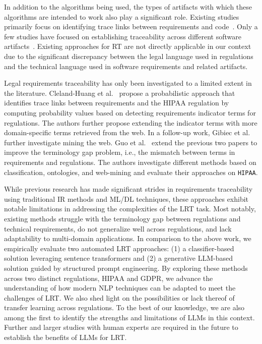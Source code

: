 In addition to the algorithms being used, the types of artifacts with which these algorithms are intended to work also play a significant role. Existing studies primarily focus on identifying trace links between requirements and code~\cite{north2024code,peng2023enhancing,cleland:2010,panichella2013and,kuang2017analyzing,gao2022using,vogelsang2025impact}. Only a few studies have focused on establishing traceability across different software artifacts~\cite{nishikawa2015recovering}.
Existing approaches for RT are not directly applicable in our context due to the significant discrepancy between the legal language used in regulations and the technical language used in software requirements and related artifacts.  

Legal requirements traceability has only been investigated to a limited extent in the literature. Cleland-Huang et al.~\cite{cleland:2010} propose a probabilistic approach that identifies trace links between requirements and the HIPAA regulation by computing probability values based on detecting requirements indicator terms for regulations. The authors further propose extending the indicator terms with more domain-specific terms retrieved from the web. In a follow-up work, Gibiec et al.~\cite{Gibiec:2010} further investigate mining the web. 
%
Guo et al.~\cite{Guo:17} extend the previous two papers to improve the terminology gap problem, i.e., the mismatch between terms in requirements and regulations. The authors investigate different methods based on classification, ontologies, and web-mining and evaluate their approaches on \texttt{HIPAA}. 

While previous research has made significant strides in requirements traceability using traditional IR methods and ML/DL techniques, these approaches exhibit notable limitations in addressing the complexities of the LRT task. Most notably, existing methods struggle with the terminology gap between regulations and technical requirements, do not generalize well across regulations, and lack adaptability to multi-domain applications. In comparison to the above work, we empirically evaluate two automated LRT approaches: (1) a classifier-based solution leveraging sentence transformers and (2) a generative LLM-based solution guided by structured prompt engineering. By exploring these methods across two distinct regulations, HIPAA and GDPR, we advance the understanding of how modern NLP techniques can be adapted to meet the challenges of LRT. We also shed light on the possibilities or lack thereof of transfer learning across regulations. To the best of our knowledge, we are also among the first to identify the strengths and limitations of LLMs in this context. Further and larger studies with human experts are required in the future to establish the benefits of LLMs for LRT. 

